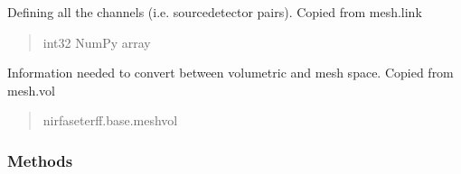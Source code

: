 \documentclass[letterpaper,10pt,english]{sphinxmanual}
\begin{document}
\begin{fulllineitems}
\begin{fulllineitems}
\label{\detokenize{_autosummary/nirfasterff.base.data.flTRMomentsdata:nirfasterff.base.data.flTRMomentsdata.link}}
\pysigstartsignatures
\pysigline
{}
\pysigstopsignatures
\sphinxAtStartPar
Defining all the channels (i.e. source\sphinxhyphen{}detector pairs). Copied from mesh.link
\begin{quote}\begin{description}
\sphinxAtStartPar
int32 NumPy array

\end{description}\end{quote}

\end{fulllineitems}


\begin{fulllineitems}
\label{\detokenize{_autosummary/nirfasterff.base.data.flTRMomentsdata:nirfasterff.base.data.flTRMomentsdata.vol}}
\pysigstartsignatures
\pysigline
{}
\pysigstopsignatures
\sphinxAtStartPar
Information needed to convert between volumetric and mesh space. Copied from mesh.vol
\begin{quote}\begin{description}
\sphinxAtStartPar
nirfaseterff.base.meshvol

\end{description}\end{quote}

\end{fulllineitems}


\begin{fulllineitems}
\label{\detokenize{_autosummary/nirfasterff.base.data.flTRMomentsdata:nirfasterff.base.data.flTRMomentsdata.__init__}}
\pysigstartsignatures
\pysiglinewithargsret
{}
{}
{}
\pysigstopsignatures
\end{fulllineitems}

\subsubsection*{Methods}



\end{fulllineitems}
\end{document}
